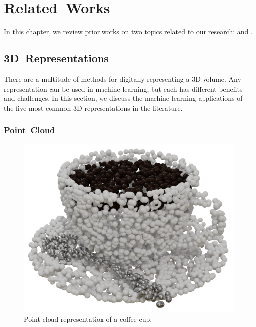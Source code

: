 
\chapter{Related~Works}
\label{chap:related_works}

In this chapter, we review prior works on two topics related to our research:  and .

\section{3D~Representations}
\label{sec:3d_representations}

There are a multitude of methods for digitally representing a 3D volume. Any representation can be used in machine learning, but each has different benefits and challenges. In this section, we discuss the machine learning applications of the five most common 3D representations in the literature.


\subsection{Point~Cloud}
\label{subsec:point_cloud}

\begin{figure}[ht]
	\centering
	\includegraphics[scale=0.2]{Images/Point Cloud Cup}
	\caption{Point cloud representation of a coffee cup.}
	\label{fig:point_cloud_cup}
\end{figure}


